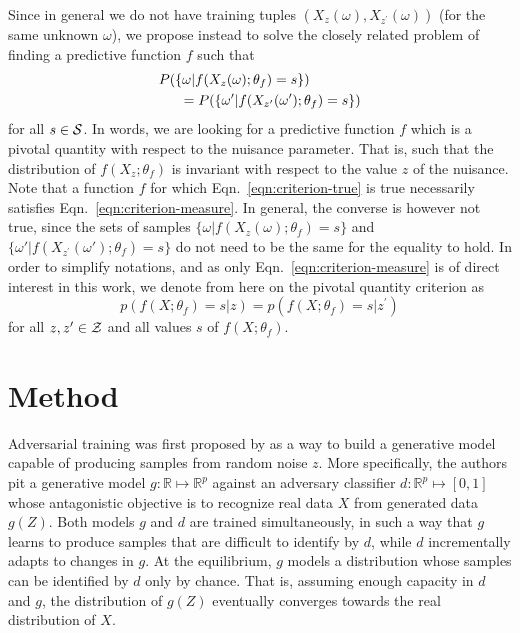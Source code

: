 \documentclass[twocolumn,superscriptaddress,aps]{revtex4-1}
\theoremstyle{plain}
\begin{document}
Since in general we do not have training tuples $(X_{z}(\omega),
X_{z^\prime}(\omega))$ (for the same unknown $\omega$), we propose instead to
solve the closely related problem of finding a predictive function $f$ such that
\begin{align}\label{eqn:criterion-measure}
    &P(\{ \omega | f(X_{z}(\omega) ; \theta_f) = s \} ) \nonumber \\
    &\indent = P( \{ \omega' | f(X_{z^\prime}(\omega') ; \theta_f) = s\})
\end{align}
for all $s \in {\cal S}$. In words, we are looking for a predictive function $f$
which is a pivotal quantity \citep{degroot1986probability} with respect to the
nuisance parameter. That is, such that  the distribution of $f(X_z; \theta_f)$
is invariant with respect to the value $z$ of the nuisance. Note that a function
$f$ for which Eqn.~\ref{eqn:criterion-true} is true necessarily satisfies
Eqn.~\ref{eqn:criterion-measure}. In general, the converse is however not true,
since the sets of samples $\{ \omega | f(X_{z}(\omega); \theta_f) = s \}$ and $\{
\omega' | f(X_{z^\prime}(\omega'); \theta_f) = s \}$ do not need to be the same
for the equality to hold. In order to simplify notations, and as only
Eqn.~\ref{eqn:criterion-measure} is of direct interest in this work, we denote
from here on the pivotal quantity criterion as
\begin{equation}\label{eqn:criterion}
    p(f(X ; \theta_f) = s | z ) = p(f(X ; \theta_f) = s | z^\prime )
\end{equation}
for all $z,z^\prime \in  {\cal Z}$ and all values $s$ of $f(X ; \theta_f)$.



\section{Method}
\label{sec:method}

Adversarial training was first proposed by \citep{goodfellow2014generative} as a
way to build a generative model capable of producing samples from random noise
$z$. More specifically, the authors pit a generative model $g:
\mathbb{R} \mapsto \mathbb{R}^p$ against an adversary classifier $d :
\mathbb{R}^p \mapsto [0, 1]$ whose antagonistic objective is to recognize
real data $X$ from generated data $g(Z)$. Both models $g$ and $d$ are trained
simultaneously, in such a way that $g$ learns to produce samples that are
difficult to identify by $d$, while $d$ incrementally adapts to changes in $g$.
At the equilibrium, $g$ models a distribution whose samples can be identified by
$d$ only by chance. That is, assuming enough capacity in $d$ and  $g$, the
distribution of $g(Z)$ eventually converges towards the real distribution
of $X$.
\end{document}
